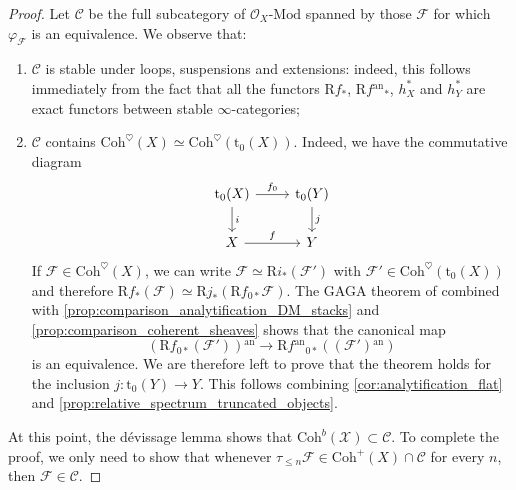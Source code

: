 \documentclass[12pt,a4paper,reqno]{amsart}
\theoremstyle{plain}
\theoremstyle{definition}
\theoremstyle{remark}
\numberwithin{equation}{section}
\begin{document}
\begin{proof}
	Let ${\mathcal C}$ be the full subcategory of ${\mathcal O}_X \textrm{-} {\mathrm{Mod}}$ spanned by those ${\mathcal F}$ for which $\varphi_{\mathcal F}$ is an equivalence.
	We observe that:
	\begin{enumerate}
		\item ${\mathcal C}$ is stable under loops, suspensions and extensions: indeed, this follows immediately from the fact that all the functors ${\mathrm R} f_*$, ${\mathrm R} f{^\mathrm{an}}_*$, $h_X^*$ and $h_Y^*$ are exact functors between stable $\infty$-categories;
		\item ${\mathcal C}$ contains ${\mathrm{Coh}}^\heartsuit(X) \simeq {\mathrm{Coh}}^\heartsuit({\mathrm{t}_0}(X))$. Indeed, we have the commutative diagram
		\[ \begin{tikzcd}
		{\mathrm{t}_0}(X) \arrow{r}{f_0} \arrow{d}{i} & {\mathrm{t}_0}(Y) \arrow{d}{j} \\
		X \arrow{r}{f} & Y
		\end{tikzcd} \]
		If ${\mathcal F} \in {\mathrm{Coh}}^\heartsuit(X)$, we can write ${\mathcal F} \simeq {\mathrm R} i_*({\mathcal F}')$ with ${\mathcal F}' \in {\mathrm{Coh}}^\heartsuit({\mathrm{t}_0}(X))$ and therefore ${\mathrm R} f_*({\mathcal F}) \simeq {\mathrm R} j_*({\mathrm R} f_{0*} {\mathcal F})$.
		The GAGA theorem of \cite[Theorem 7.3]{Porta_Yu_Higher_analytic_stacks_2014} combined with \cref{prop:comparison_analytification_DM_stacks} and \cref{prop:comparison_coherent_sheaves} shows that the canonical map
		\[ ({\mathrm R} f_{0*} ({\mathcal F}')){^\mathrm{an}} \to {\mathrm R} f{^\mathrm{an}}_{0*} (({\mathcal F}'){^\mathrm{an}}) \]
		is an equivalence.
		We are therefore left to prove that the theorem holds for the inclusion $j \colon {\mathrm{t}_0}(Y) \to Y$. This follows combining \cref{cor:analytification_flat} and \cref{prop:relative_spectrum_truncated_objects}.
	\end{enumerate}
	At this point, the d\'evissage lemma \cite[Lemma 5.10]{Porta_Yu_Higher_analytic_stacks_2014} shows that ${\mathrm{Coh}}^b({\mathcal X}) \subset {\mathcal C}$.
	To complete the proof, we only need to show that whenever $\tau_{\le n} {\mathcal F} \in {\mathrm{Coh}}^+(X) \cap {\mathcal C}$ for every $n$, then ${\mathcal F} \in {\mathcal C}$.
	

\end{proof}
\end{document}
